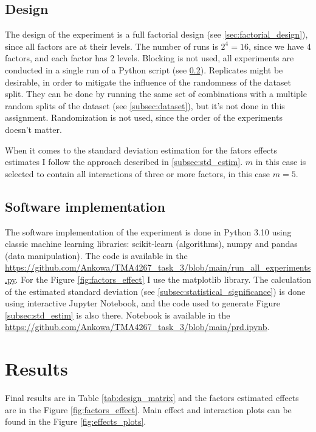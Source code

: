 \documentclass{article}
\begin{document}
\subsection{Design}
The design of the experiment is a full factorial design (see \ref{sec:factorial_design}), since all factors are at their levels. The number of runs is $2^4 = 16$, since we have 4 factors, and each factor has 2 levels. Blocking is not used, all experiments are conducted in a single run of a Python script (see \ref{subsec:software_implementation}). Replicates might be desirable, in order to mitigate the influence of the randomness of the dataset split. They can be done by running the same set of combinations with a multiple random splits of the dataset (see \ref{subsec:dataset}), but it's not done in this assignment. Randomization is not used, since the order of the experiments doesn't matter.

When it comes to the standard deviation estimation for the fators effects estimates I follow the approach described in \ref{subsec:std_estim}. $m$ in this case is selected to contain all interactions of three or more factors, in this case $m=5$.

\subsection{Software implementation}
\label{subsec:software_implementation}

The software implementation of the experiment is done in Python 3.10 using classic machine learning libraries: scikit-learn (algorithms), numpy and pandas (data manipulation). The code is available in the \url{https://github.com/Ankowa/TMA4267_task_3/blob/main/run_all_experiments.py}. For the Figure \ref{fig:factors_effect} I use the matplotlib library. The calculation of the estimated standard deviation (see \ref{subsec:statistical_significance}) is done using interactive Jupyter Notebook, and the code used to generate Figure \ref{subsec:std_estim} is also there. Notebook is available in the \url{https://github.com/Ankowa/TMA4267_task_3/blob/main/prd.ipynb}.

\section{Results}

Final results are in Table \ref{tab:design_matrix} and the factors estimated effects are in the Figure \ref{fig:factors_effect}. Main effect and interaction plots can be found in the Figure \ref{fig:effects_plots}.
\end{document}
